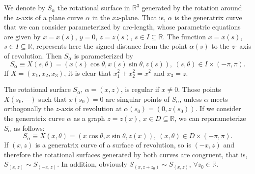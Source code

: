 \documentclass[leqno,11pt]{amsart}
\def\R{\mathbb{R}}
\theoremstyle{definition}
\numberwithin{equation}{section}
\begin{document}
We denote by $S_\alpha$ the rotational surface in $\R^3$ generated by the rotation around the $z$-axis of a plane curve $\alpha$ in the $xz$-plane. That is, $\alpha $ is the generatrix curve that we can consider parameterized by arc-length, whose parametric equations are given by $x=x(s)$, $y=0$, $z= z(s)$, $s\in I \subseteq \R$. The function $x=x(s)$, $s\in I \subseteq \R$, represents here the signed distance from the point $\alpha(s)$ to the $z$- axis of revolution. Then $S_\alpha $ is parameterized by
$$ S_\alpha \equiv X(s,\theta)=\left(x(s)  \cos \theta, x(s)\sin \theta, z(s)\right), \
(s,\theta)\in I \times (-\pi,\pi).$$
If $X=(x_1,x_2,x_3)$, it is clear that $x_1^2+x_2^2=x^2$ and $x_3=z$.

The rotational surface $S_\alpha $, $\alpha =(x,z)$, is regular if $x\neq 0$. Those points $X(s_0,-)$ such that $x(s_0)=0$ are singular points of $S_\alpha $, unless $\alpha $  meets orthogonally the $z$-axis of revolution  at $\alpha (s_0)=(0,z(s_0))$. If we consider the generatrix curve $\alpha$ as a graph $z=z(x)$, $x \in D \subseteq \R$, we can reparameterize $S_\alpha $ as follows:
$$ S_\alpha \equiv X(x,\theta)=\left(x  \cos \theta, x \sin \theta, z(x) \right), \
(x,\theta)\in D \times (-\pi,\pi).$$
If $(x,z)$ is a generatrix curve of a surface of revolution, so is $(-x,z)$ 
and therefore the rotational surfaces generated by both curves are congruent, that is, $S_{(x,z)}\sim S_{(-x,z)}$. 
In addition, obviously $S_{(x,z+z_0)}\sim S_{(x,z)}$, 
$\forall z_0 \in \R$.
\end{document}

